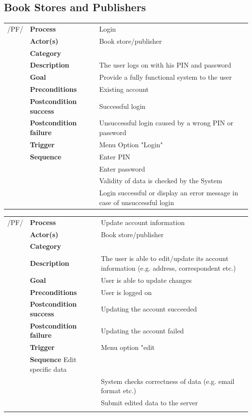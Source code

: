 \documentclass[11pt,a4paper,oneside,svgnames]{report}
\begin{document}
\subsection{Book Stores and Publishers}

\noindent
\begin{tabular}{p{1.5cm}p{3cm}p{8cm}}
/PF/	& \textbf{Process} & Login\\
		& \textbf{Actor(s)} & Book store/publisher\\
		& \textbf{Category} & \\
		& \textbf{Description}	 & The user logs on with his PIN and password\\
		& \textbf{Goal} & Provide a fully functional system to the user\\
		& \textbf{Preconditions} & Existing account\\
		& \textbf{Postcondition success} & Successful login\\
		& \textbf{Postcondition failure} & Unsuccessful login caused by a wrong PIN or password\\
		& \textbf{Trigger} & Menu Option "Login"\\
		& \textbf{Sequence} & Enter PIN\\
		& & Enter password\\
		& & Validity of data is checked by the System\\
		& & Login successful or display an error message in case of unsuccessful login
		
\hfill \\
\end{tabular}

\noindent
\begin{tabular}{p{1.5cm}p{3cm}p{8cm}}
/PF/	& \textbf{Process} & Update account information\\
		& \textbf{Actor(s)} & Book store/publisher\\
		& \textbf{Category} & \\
		& \textbf{Description}	 & The user is able to edit/update its account information (e.g. address, correspondent etc.)\\
		& \textbf{Goal} & User is able to update changes\\
		& \textbf{Preconditions} & User is logged on\\
		& \textbf{Postcondition success} & Updating the account succeeded\\
		& \textbf{Postcondition failure} & Updating the account failed\\
		& \textbf{Trigger} & Menu option "edit\\
		& \textbf{Sequence} Edit specific data\\
		& & System checks correctness of data (e.g. email format etc.)\\
		& & Submit edited data to the server\\
		
\hfill \\
\end{tabular}
\end{document}
